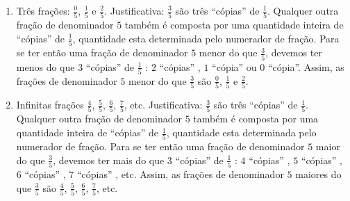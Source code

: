 \begin{multicols}{2}
\begin{orientacoes}{}{}

\end{orientacoes}

\begin{solucao}{}{}
\begin{enumerate} [\quad a)] %
    \item       Três frações:       $\frac{0}{5}$,       $\frac{1}{5}$       e
    $\frac{2}{5}$. Justificativa:       $\frac{3}{5}$       são três
``cópias''       de       $\frac{1}{5}$. Qualquer outra fração de denominador
   $5$       também é composta por uma quantidade inteira de       ``cópias''
   de       $\frac{1}{5}$, quantidade esta determinada pelo numerador de fração.
Para se ter então uma fração de denominador       $5$       menor do que
$\frac{3}{5}$, devemos ter menos do que       $3$             ``cópias''
de       $\frac{1}{5}$      :       $2$             ``cópias''      ,       $1$
           ``cópia''       ou       $0$             ``cópia''. Assim, as
frações de denominador       $5$       menor do que       $\frac{3}{5}$
são       $\frac{0}{5}$,       $\frac{1}{5}$       e       $\frac{2}{5}$.
    \item       Infinitas frações       $\frac{4}{5}$,       $\frac{5}{5}$,
 $\frac{6}{5}$,       $\frac{7}{5}$, etc. Justificativa:       $\frac{3}{5}$
  são três       ``cópias''       de       $\frac{1}{5}$. Qualquer outra fração
de denominador       $5$       também é composta por uma quantidade inteira de
    ``cópias''       de       $\frac{1}{5}$, quantidade esta determinada pelo
numerador de fração. Para se ter então uma fração de denominador       $5$
maior do que       $\frac{3}{5}$, devemos ter mais do que       $3$
``cópias''       de       $\frac{1}{5}$      :       $4$             ``cópias''
    ,       $5$             ``cópias''      ,       $6$             ``cópias''
   ,       $7$             ``cópias''      , etc. Assim, as frações de
denominador       $5$       maiores do que       $\frac{3}{5}$       são
$\frac{4}{5}$,       $\frac{5}{5}$,       $\frac{6}{5}$,       $\frac{7}{5}$,
etc.
\end{enumerate} %


\end{solucao}
\end{multicols}
